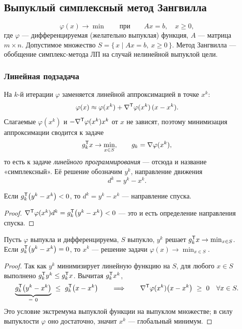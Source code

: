 \subsection{Выпуклый симплексный метод Зангвилла}
\label{subsec:zangwill}

\[
  \varphi(x) \to \min
  \qquad\text{при}\qquad
  Ax = b , \quad x \ge 0 ,
\]
где $\varphi$ — дифференцируемая (желательно выпуклая) функция, $A$ — матрица
$m \times n$. Допустимое множество $S = \{\, x \mid Ax = b,\ x \ge 0 \,\}$.
Метод Зангвилла — обобщение симплекс-метода ЛП на случай нелинейной выпуклой
цели.

\subsubsection*{Линейная подзадача}

На $k$-й итерации $\varphi$ заменяется линейной аппроксимацией в точке $x^k$:
\[
  \varphi(x) \approx \varphi(x^k) + \nabla^{\mathsf{T}}\varphi(x^k)\,(x - x^k) .
\]
Слагаемые $\varphi(x^k)$ и $-\nabla^{\mathsf{T}}\varphi(x^k)x^k$ от $x$ не зависят,
поэтому минимизация аппроксимации сводится к задаче
\[
  g_k^{\mathsf{T}} x \to \min_{x \in S} ,
  \qquad g_k = \nabla\varphi(x^k) ,
\]
то есть к задаче \emph{линейного программирования} — отсюда и название
«симплексный». Её решение обозначим $y^k$, направление движения
\[
  d^k = y^k - x^k .
\]

\begin{theorem}\label{thm:zangwill-descent}
Если $g_k^{\mathsf{T}}\big(y^k - x^k\big) < 0$, то $d^k = y^k - x^k$ — направление спуска.
\end{theorem}

\begin{proof}
$\nabla^{\mathsf{T}}\varphi(x^k)d^k = g_k^{\mathsf{T}}\big(y^k - x^k\big) < 0$ — это и есть
определение направления спуска.
\end{proof}

\begin{theorem}\label{thm:zangwill-opt}
Пусть $\varphi$ выпукла и дифференцируема, $S$ выпукло, $y^k$ решает
$g_k^{\mathsf{T}} x \to \min_{x\in S}$. Если $g_k^{\mathsf{T}}\big(y^k - x^k\big) = 0$, то $x^k$ —
решение задачи $\varphi(x) \to \min_{x \in S}$.
\end{theorem}

\begin{proof}
Так как $y^k$ минимизирует линейную функцию на $S$, для любого $x \in S$
выполнено $g_k^{\mathsf{T}} y^k \le g_k^{\mathsf{T}} x$. Вычитая $g_k^{\mathsf{T}} x^k$,
\[
  \underbrace{g_k\T\big(y^k - x^k\big)}_{=\ 0} \ \le\ g_k\T\big(x - x^k\big)
  \qquad\Longrightarrow\qquad
  \nabla\T\varphi(x^k)\big(x - x^k\big) \ \ge\ 0 \quad \forall x \in S .
\]
Это условие экстремума выпуклой функции на выпуклом множестве; в силу
выпуклости $\varphi$ оно достаточно, значит $x^k$ — глобальный минимум.
\end{proof}

